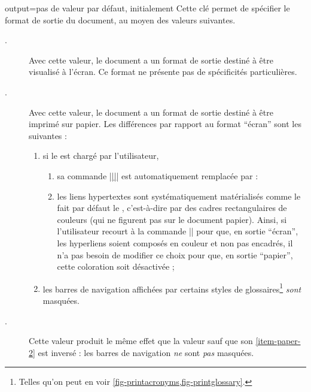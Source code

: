 \begin{docKey}{output}{=\textbar{}\textbar{}}{pas
    de valeur par défaut, initialement }
  Cette clé permet de spécifier le format de sortie du document, au moyen des
  valeurs suivantes.
  \begin{description}
  \item[.] Avec cette valeur, le document a un format de
    sortie destiné à être visualisé à l'écran. Ce format ne présente pas de
    spécificités particulières.
  \item[.] Avec cette valeur, le document a un format de sortie
    destiné à être imprimé sur papier. Les différences par rapport au format
    \enquote{écran} sont les suivantes :
    \begin{enumerate}
    \item si le  est chargé par l'utilisateur,
      \begin{enumerate}
      \item\label{item-paper-1} sa commande
        |\href{|\meta{\acrshort*{url}}|}{||}| est automatiquement
        remplacée par :
      \item les liens hypertextes sont systématiquement matérialisés comme le
        fait par défaut le , c'est-à-dire par des cadres
        rectangulaires de couleurs (qui ne figurent pas sur le document
        papier). Ainsi, si l'utilisateur recourt à la commande
        |\hypersetup{colorlinks=true}| pour que, en sortie \enquote{écran}, les
        hyperliens soient composés en couleur et non pas encadrés, il n'a pas
        besoin de modifier ce choix pour que, en sortie \enquote{papier}, cette
        coloration soit désactivée ;
      \end{enumerate}
      \item\label{item-paper-2} les barres de navigation affichées par certains
        styles de glossaires\footnote{Telles qu'on peut en voir
          \vref{fig-printacronyms,fig-printglossary}.} \emph{sont} masquées.
    \end{enumerate}
  \item[.] Cette valeur produit le même effet que la valeur
     sauf que son \vref{item-paper-2} est inversé : les barres
    de navigation \emph{ne} sont \emph{pas} masquées.
  \end{description}
\end{docKey}

